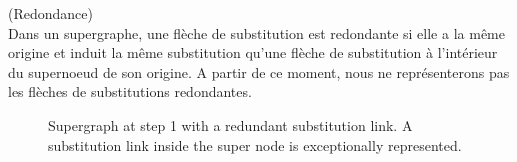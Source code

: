 \begin{mydef} (Redondance) 
\\Dans un supergraphe, une flèche de substitution est redondante si elle a la m\^eme origine et induit la m\^eme substitution qu'une flèche de substitution à l'intérieur du supernoeud de son origine. A partir de ce moment, nous ne représenterons pas les flèches de substitutions redondantes.
\end{mydef}


\begin{figure}[h!]
\begin{center}
\end{center}
\caption{Supergraph at step 1 with a redundant substitution link. A substitution link inside the super node is exceptionally represented.}
\end{figure}

